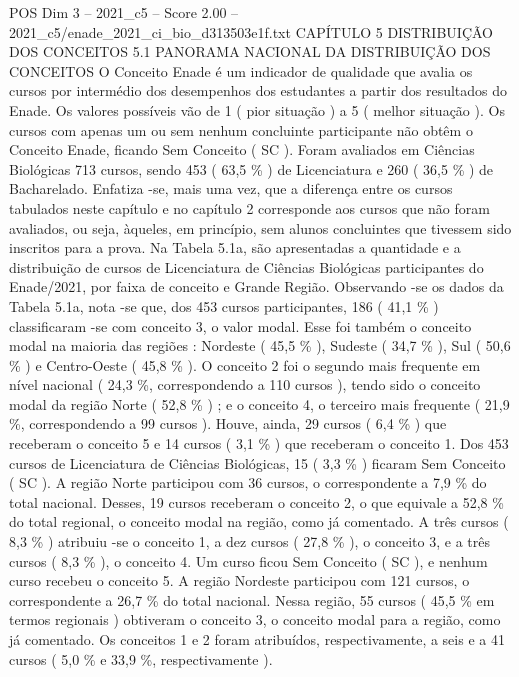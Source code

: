 \begin{textsample}{POS Dim 3 – 2021\_c5 – Score 2.00 – 2021\_c5/enade\_2021\_ci\_bio\_d313503e1f.txt}  \label{ex:f3_pos_087}
CAPÍTULO 5 DISTRIBUIÇÃO DOS CONCEITOS 5.1 PANORAMA NACIONAL DA DISTRIBUIÇÃO DOS CONCEITOS O Conceito Enade é um indicador de qualidade que avalia os cursos por intermédio dos desempenhos dos estudantes a partir dos resultados do Enade.
Os valores possíveis vão de 1 ( pior situação ) a 5 ( melhor situação ).
Os cursos com apenas um ou sem nenhum concluinte participante não obtêm o Conceito Enade, ficando Sem Conceito ( SC ).
Foram avaliados em Ciências Biológicas 713 cursos, sendo 453 ( 63,5 \% ) de Licenciatura e 260 ( 36,5 \% ) de Bacharelado.
Enfatiza -se, mais uma vez, que a diferença entre os cursos tabulados neste capítulo e no capítulo 2 corresponde aos cursos que não foram avaliados, ou seja, àqueles, em princípio, sem alunos concluintes que tivessem sido inscritos para a prova.
Na Tabela 5.1a, são apresentadas a quantidade e a distribuição de cursos de Licenciatura de Ciências Biológicas participantes do Enade/2021, por faixa de conceito e Grande Região.
Observando -se os dados da Tabela 5.1a, nota -se que, dos 453 cursos participantes, 186 ( 41,1 \% ) classificaram -se com conceito 3, o valor modal.
Esse foi também o conceito modal na maioria das regiões : Nordeste ( 45,5 \% ), Sudeste ( 34,7 \% ), Sul ( 50,6 \% ) e Centro-Oeste ( 45,8 \% ).
O conceito 2 foi o segundo mais frequente em nível nacional ( 24,3 \%, correspondendo a 110 cursos ), tendo sido o conceito modal da região Norte ( 52,8 \% ) ; e o conceito 4, o terceiro mais frequente ( 21,9 \%, correspondendo a 99 cursos ).
Houve, ainda, 29 cursos ( 6,4 \% ) que receberam o conceito 5 e 14 cursos ( 3,1 \% ) que receberam o conceito 1.
Dos 453 cursos de Licenciatura de Ciências Biológicas, 15 ( 3,3 \% ) ficaram Sem Conceito ( SC ).
A região Norte participou com 36 cursos, o correspondente a 7,9 \% do total nacional.
Desses, 19 cursos receberam o conceito 2, o que equivale a 52,8 \% do total regional, o conceito modal na região, como já comentado.
A três cursos ( 8,3 \% ) atribuiu -se o conceito 1, a dez cursos ( 27,8 \% ), o conceito 3, e a três cursos ( 8,3 \% ), o conceito 4.
Um curso ficou Sem Conceito ( SC ), e nenhum curso recebeu o conceito 5.
A região Nordeste participou com 121 cursos, o correspondente a 26,7 \% do total nacional.
Nessa região, 55 cursos ( 45,5 \% em termos regionais ) obtiveram o conceito 3, o conceito modal para a região, como já comentado.
Os conceitos 1 e 2 foram atribuídos, respectivamente, a seis e a 41 cursos ( 5,0 \% e 33,9 \%, respectivamente ).

\end{textsample}
